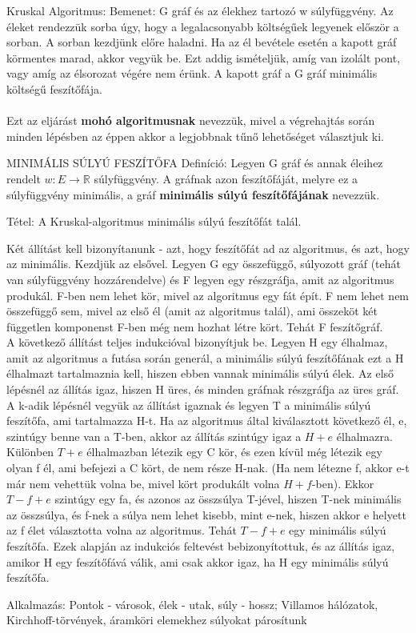 \begin{framed}
Kruskal Algoritmus: Bemenet: G gráf és az élekhez tartozó w súlyfüggvény. Az éleket rendezzük sorba úgy, hogy a legalacsonyabb költségűek legyenek először a sorban. A sorban kezdjünk előre haladni. Ha az él bevétele esetén a kapott gráf körmentes marad, akkor vegyük be. Ezt addig ismételjük, amíg van izolált pont, vagy amíg az élsorozat végére nem érünk. A kapott gráf a G gráf minimális költségű feszítőfája.
\\
\\
Ezt az eljárást \textbf{mohó algoritmusnak} nevezzük, mivel a végrehajtás során minden lépésben az éppen akkor a legjobbnak tűnő lehetőséget választjuk ki.
\end{framed}
\begin{shaded}
MINIMÁLIS SÚLYÚ FESZÍTŐFA Definíció: Legyen G gráf és annak éleihez rendelt $w: E \rightarrow \mathbb{R}$ súlyfüggvény. A gráfnak azon feszítőfáját, melyre ez a súlyfüggvény minimális, a gráf \textbf{minimális súlyú feszítőfájának} nevezzük.
\end{shaded}
\begin{framed}
Tétel: A Kruskal-algoritmus minimális súlyú feszítőfát talál.
\end{framed}
\begin{leftbar}
Két állítást kell bizonyítanunk - azt, hogy feszítőfát ad az algoritmus, és azt, hogy az minimális. Kezdjük az elsővel. Legyen G egy összefüggő, súlyozott gráf (tehát van súlyfüggvény hozzárendelve) és F legyen egy részgráfja, amit az algoritmus produkál. F-ben nem lehet kör, mivel az algoritmus egy fát épít. F nem lehet nem összefüggő sem, mivel az első él (amit az algoritmus talál), ami összeköt két független komponenst F-ben még nem hozhat létre kört. Tehát F feszítőgráf.
\\
A következő állítást teljes indukcióval bizonyítjuk be. Legyen H egy élhalmaz, amit az algoritmus a futása során generál, a minimális súlyú feszítőfának ezt a H élhalmazt tartalmaznia kell, hiszen ebben vannak minimális súlyú élek.
Az első lépésnél az állítás igaz, hiszen H üres, és minden gráfnak részgráfja az üres gráf. A k-adik lépésnél vegyük az állítást igaznak és legyen T a minimális súlyú feszítőfa, ami tartalmazza H-t. Ha az algoritmus által kiválasztott következő él, e, szintúgy benne van a T-ben, akkor az állítás szintúgy igaz a $H + {e}$ élhalmazra. Különben $T + {e}$ élhalmazban létezik egy C kör, és ezen kívül még létezik egy olyan f él, ami befejezi a C kört, de nem része H-nak. (Ha nem létezne f, akkor e-t már nem vehettük volna be, mivel kört produkált volna $H + f$-ben). Ekkor $T - {f} + {e}$ szintúgy egy fa, és azonos az összsúlya T-jével, hiszen T-nek minimális az összsúlya, és f-nek a súlya nem lehet kisebb, mint e-nek, hiszen akkor e helyett az f élet választotta volna az algoritmus. Tehát $T - {f} + {e}$ egy minimális súlyú feszítőfa. Ezek alapján az indukciós feltevést bebizonyítottuk, és az állítás igaz, amikor H egy feszítőfává válik, ami csak akkor igaz, ha H egy minimális súlyú feszítőfa.
\end{leftbar}
\begin{framed}
Alkalmazás: Pontok - városok, élek - utak, súly - hossz; Villamos hálózatok, Kirchhoff-törvények, áramköri elemekhez súlyokat párosítunk
\end{framed}
